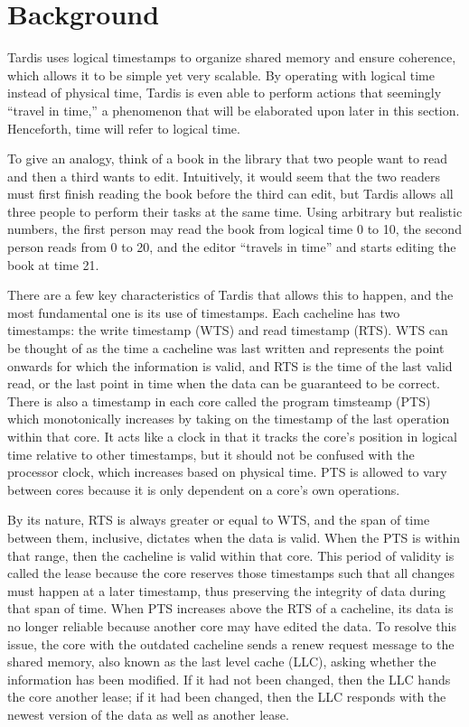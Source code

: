 \documentclass[12pt]{article}
\begin{document}
	\section{Background}
	\label{sec:background}
	
	Tardis uses logical timestamps to organize shared memory and ensure coherence, which allows it to be simple yet very scalable. By operating with logical time instead of physical time, Tardis is even able to perform actions that seemingly “travel in time,” a phenomenon that will be elaborated upon later in this section. Henceforth, time will refer to logical time.
	
	
	To give an analogy, think of a book in the library that two people want to read and then a third wants to edit. Intuitively, it would seem that the two readers must first finish reading the book before the third can edit, but Tardis allows all three people to perform their tasks at the same time.  Using arbitrary but realistic numbers, the first person may read the book from logical time 0 to 10, the second person reads from 0 to 20, and the editor “travels in time” and starts editing the book at time 21.
	
	
	There are a few key characteristics of Tardis that allows this to happen, and the most fundamental one is its use of timestamps. Each cacheline has two timestamps: the write timestamp (WTS) and read timestamp (RTS). WTS can be thought of as the time a cacheline was last written and represents the point onwards for which the information is valid, and RTS is the time of the last valid read, or the last point in time when the data can be guaranteed to be correct. There is also a timestamp in each core called the program timsteamp (PTS) which monotonically increases by taking on the timestamp of the last operation within that core. It acts like a clock in that it tracks the core's position in logical time relative to other timestamps, but it should not be confused with the processor clock, which increases based on physical time. PTS is allowed to vary between cores because it is only dependent on a core's own operations.
	
	
	By its nature, RTS is always greater or equal to WTS, and the span of time between them, inclusive, dictates when the data is valid. When the PTS is within that range, then the cacheline is valid within that core. This period of validity is called the lease because the core reserves those timestamps such that all changes must happen at a later timestamp, thus preserving the integrity of data during that span of time. When PTS increases above the RTS of a cacheline, its data is no longer reliable because another core may have edited the data. To resolve this issue, the core with the outdated cacheline sends a renew request message to the shared memory, also known as the last level cache (LLC), asking whether the information has been modified. If it had not been changed, then the LLC hands the core another lease; if it had been changed, then the LLC responds with the newest version of the data as well as another lease.
	
\end{document}
